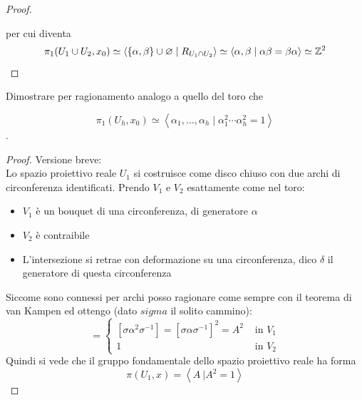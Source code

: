 \begin{proof}
\begin{figure}[h]
		\caption{}
		\label{fig:fundamental-group-torus-2}
	\end{figure}	
	per cui diventa
	\begin{equation*}
		\pi_1(U_1 \cup U_2, x_0) \simeq \left\langle \{\alpha, \beta\} \cup \varnothing \mid R_{U_1 \cap U_2} \right\rangle \simeq \left\langle \alpha, \beta \mid \alpha \beta = \beta \alpha \right\rangle \simeq \mathbb{Z}^2
	\end{equation*} 
\end{proof}

\begin{xca}
	Dimostrare per ragionamento analogo a quello del toro che 
	
	\begin{equation*}
		\pi_1(U_h, x_0) \simeq \left\langle \alpha_1, \dots, \alpha_h \mid \alpha^2_1 \cdots \alpha^2_h = 1\right\rangle
	\end{equation*}.
\end{xca}
\begin{proof} Versione breve: \\
	Lo spazio proiettivo reale $U_1$ si costruisce come disco chiuso con due archi di circonferenza identificati. Prendo $V_1$ e $V_2$ esattamente come nel toro:
	\begin{itemize}
		\item $V_1$ è un bouquet di una circonferenza, di generatore $\alpha$
		\item $V_2$ è contraibile
		\item L'intersezione si retrae con deformazione su una circonferenza, dico $\delta$ il generatore di questa circonferenza
	\end{itemize}
	Siccome sono connessi per archi posso ragionare come sempre con il teorema di van Kampen ed ottengo (dato $sigma$ il solito cammino):
	\begin{equation*}
	[\delta]=\begin{cases}
	[\sigma \alpha^2 \sigma^{-1}]=[\sigma \alpha \sigma^{-1}]^2=A^2 & \text{ in $V_1$}\\
	1 & \text{ in $V_2$}
	\end{cases}
	\end{equation*}
	Quindi si vede che il gruppo fondamentale dello spazio proiettivo reale ha forma
	\begin{equation*}
	\pi(U_1,x)=\left\langle A \ | A^2 = 1 \right\rangle 
	\end{equation*}
\end{proof}
